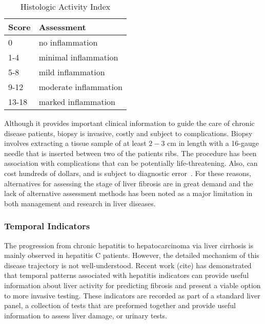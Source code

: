 \begin{table}[ht]
\caption{Histologic Activity Index}
\label{hai}
\vskip 0.15in
\begin{center}
\begin{tabular}{ll}
\hline
\textbf{Score}	&  \textbf{Assessment}\\
\hline
0 & no inflammation  \\
1-4 & minimal inflammation  \\
5-8 & mild inflammation  \\
9-12 & moderate inflammation  \\
13-18 & marked inflammation  \\
\hline
\end{tabular}
\end{center}
\vskip -0.1in
\end{table}

Although it provides important clinical information to guide the care of chronic disease patients, biopsy is invasive, costly and subject to complications.  Biopsy involves extracting a tissue sample of at least $2-3$ cm in length with a 16-gauge needle that is inserted between two of the patients ribs.  The procedure has been association with complications that can be potentially life-threatening.  Also, can cost hundreds of dollars, and is subject to diagnostic error~\cite{Castera2012}.   For these reasons, alternatives for assessing the stage of liver fibrosis are in great demand and the lack of alternative assessment methods has been noted as a major limitation in both management and research in liver diseases.

\subsubsection{Temporal Indicators}
The progression from chronic hepatitis to hepatocarcinoma via liver cirrhosis is mainly observed in hepatitis C patients.  However, the detailed mechanism of this disease trajectory is not well-understood.  Recent work (cite) has demonstrated that temporal patterns associated with hepatitis indicators can provide useful information about liver activity for predicting fibrosis and present a viable option to more invasive testing.  These indicators are recorded as part of a standard liver panel, a collection of tests that are preformed together and provide useful information to assess liver damage, or urinary tests.





